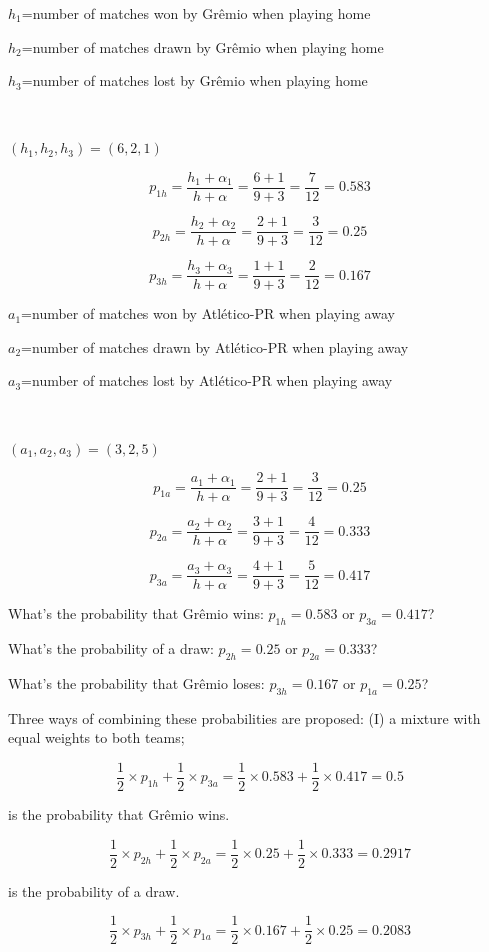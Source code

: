 \documentclass[journal,article,accept,moreauthors,pdftex,12pt,a4paper]{mdpi}
\begin{document}
$h_1$=number of matches won by Gr\^emio when playing home

$h_2$=number of matches drawn by Gr\^emio when playing home

$h_3$=number of matches lost by Gr\^emio when playing home

\

$(h_1,h_2,h_3)=(6,2,1)$


\[
p_{1h}=\frac{h_1+\alpha_1}{h+\alpha}=\frac{6+1}{9+3}=\frac{7}{12}=0.583\]

\[
p_{2h}=\frac{h_2+\alpha_2}{h+\alpha}=\frac{2+1}{9+3}=\frac{3}{12}=0.25\]

\[
p_{3h}=\frac{h_3+\alpha_3}{h+\alpha}=\frac{1+1}{9+3}=\frac{2}{12}=0.167\]


$a_1$=number of matches won by Atl\'etico-PR when playing away

$a_2$=number of matches drawn by Atl\'etico-PR when playing away

$a_3$=number of matches lost by Atl\'etico-PR when playing away

\

$(a_1,a_2,a_3)=(3,2,5)$


\[
p_{1a}=\frac{a_1+\alpha_1}{h+\alpha}=\frac{2+1}{9+3}=\frac{3}{12}=0.25\]

\[
p_{2a}=\frac{a_2+\alpha_2}{h+\alpha}=\frac{3+1}{9+3}=\frac{4}{12}=0.333\]

\[
p_{3a}=\frac{a_3+\alpha_3}{h+\alpha}=\frac{4+1}{9+3}=\frac{5}{12}=0.417\]


What's the probability that Gr\^emio wins: $p_{1h}=0.583$ or $p_{3a}=0.417$?

What's the probability of a draw: $p_{2h}=0.25$ or $p_{2a}=0.333$?

What's the probability that Gr\^emio loses: $p_{3h}=0.167$ or $p_{1a}=0.25$?


Three ways of combining these probabilities are proposed: (I) a mixture with equal weights to both teams; 

\[
\frac{1}{2}\times p_{1h}+\frac{1}{2}\times p_{3a}=\frac{1}{2}\times0.583+\frac{1}{2}\times0.417=0.5
\]

\noindent
is the probability that Gr\^emio wins.


\[
\frac{1}{2}\times p_{2h}+\frac{1}{2}\times p_{2a}=\frac{1}{2}\times0.25+\frac{1}{2}\times0.333=0.2917
\]

\noindent
is the probability of a draw.

\[
\frac{1}{2}\times p_{3h}+\frac{1}{2}\times p_{1a}=\frac{1}{2}\times0.167+\frac{1}{2}\times0.25=0.2083
\]
\end{document}

